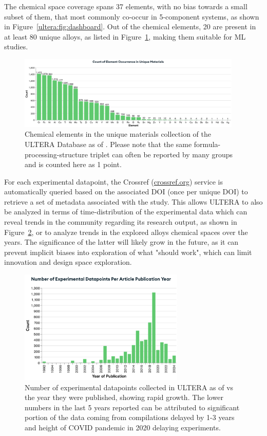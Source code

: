 The chemical space coverage spans 37 elements, with no bias towards a small subset of them, that most commonly co-occur in 5-component systems, as shown in Figure~\ref{ultera:fig:dashboard}. Out of the chemical elements, 20 are present in at least 80 unique alloys, as listed in Figure~\ref{ultera:fig:chemistries}, making them suitable for ML studies.

\begin{figure}[H]
    \centering
    \includegraphics[width=0.95\textwidth]{ultera/ultera_Chemistries.png}
    \caption{Chemical elements in the unique materials collection of the ULTERA Database as of \statisticstime. Please note that the same formula-processing-structure triplet can often be reported by many groups and is counted here as 1 point.}
    \label{ultera:fig:chemistries}
\end{figure}

For each experimental datapoint, the Crossref (\href{https://www.crossref.org}{crossref.org}) service is automatically queried based on the associated DOI (once per unique DOI) to retrieve a set of metadata associated with the study. This allows ULTERA to also be analyzed in terms of time-distribution of the experimental data which can reveal trends in the community regarding its research output, as shown in Figure~\ref{ultera:fig:publicationyears}, or to analyze trends in the explored alloys chemical spaces over the years. The significance of the latter will likely grow in the future, as it can prevent implicit biases into exploration of what "should work", which can limit innovation and design space exploration.

\begin{figure}[H]
    \centering
    \includegraphics[width=0.7\textwidth]{ultera/ultera_PublicationYear.png}
    \caption{Number of experimental datapoints collected in ULTERA as of \statisticstime vs the year they were published, showing rapid growth. The lower numbers in the last 5 years reported can be attributed to significant portion of the data coming from compilations delayed by 1-3 years and height of COVID pandemic in 2020 delaying experiments.}
    \label{ultera:fig:publicationyears}
\end{figure}

